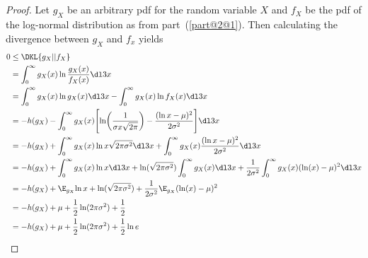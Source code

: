 \documentclass[
  coursecode={MTHE 474},
  assignmentname={Homework \homeworknumber},
  studentnumber=20053722,
  name={Bryan Hoang},
  draft,
]{
  ltxanswer%
}
\begin{document}
\begin{questions}
\begin{parts}
      \part{}
      \begin{solution}
        \begin{proof}
          Let \(g_{X}\) be an arbitrary pdf for the random variable \(X\) and \(f_{X}\) be the pdf of the log-normal distribution as from part~(\ref{part@2@1}). Then calculating the divergence between \(g_{X}\) and \(f_{x}\) yields
          \begin{align*}
            0 &\le \DKL{g_{X} || f_{X}}                                                                                                                                                                       \\
              &= \int_{0}^{\infty} g_{X}(x) \ln \frac{g_{X}(x)}{f_{X}(x)} \dl3x                                                                                                                               \\
              &= \int_{0}^{\infty} g_{X}(x) \ln g_{X}(x) \dl3x - \int_{0}^{\infty} g_{X}(x) \ln f_{X}(x) \dl3x                                                                                                \\
              &= -h(g_{X}) - \int_{0}^{\infty} g_{X}(x) \Biggl[\ln \biggl(\frac{1}{\sigma x\sqrt{2\pi}}\biggr) - \frac{(\ln x-\mu)^{2}}{2\sigma^{2}}\Biggr] \dl3x                                             \\
              &= -h(g_{X}) + \int_{0}^{\infty} g_{X}(x) \ln x\sqrt{2\pi\sigma^{2}} \dl3x + \int_{0}^{\infty} g_{X}(x) \frac{(\ln x-\mu)^{2}}{2\sigma^{2}} \dl3x                                               \\
              &= -h(g_{X}) + \int_{0}^{\infty} g_{X}(x) \ln x \dl3x + \ln(\sqrt{2\pi\sigma^{2}}) \int_{0}^{\infty} g_{X}(x) \dl3x  + \frac{1}{2\sigma^{2}} \int_{0}^{\infty} g_{X}(x) (\ln (x)-\mu)^{2} \dl3x \\
              &= -h(g_{X}) + \E_{g_{X}}{\ln x} + \ln (\sqrt{2\pi\sigma^{2}}) + \frac{1}{2\sigma^{2}} \E_{g_{X}}{(\ln (x)-\mu)^{2}}                                                                            \\
              &= -h(g_{X}) + \mu + \frac{1}{2} \ln (2\pi\sigma^{2}) + \frac{1}{2}                                                                                                                             \\
              &= -h(g_{X}) + \mu + \frac{1}{2} \ln (2\pi\sigma^{2}) + \frac{1}{2}\ln{e}                                                                                                                       \\

\end{align*}
\end{proof}
\end{solution}
\end{parts}
\end{questions}
\end{document}
